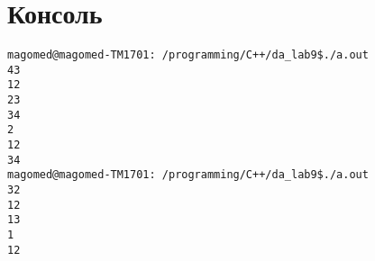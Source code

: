 \begin{lstlisting}[language=C]
\end{lstlisting}

\pagebreak

\section{Консоль}
\begin{alltt}
magomed@magomed-TM1701:~/programming/C++/da_lab9\$ ./a.out 
4 3
1 2
2 3
3 4
2
1 2
3 4
magomed@magomed-TM1701:~/programming/C++/da_lab9\$ ./a.out 
3 2
1 2
1 3
1
1 2
\end{alltt}
\pagebreak

